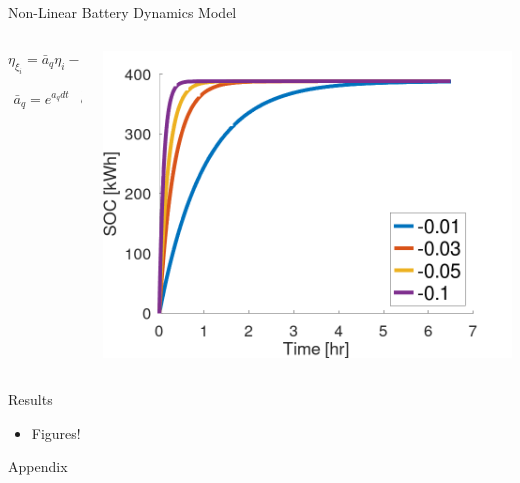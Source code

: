 \documentclass[aspectratio=169]{beamer}
\begin{document}
\begin{frame}[label={sec:org5c096d4}]{Non-Linear Battery Dynamics Model}
\begin{columns}
\begin{column}{0.3\columnwidth}
\begin{equation*}
  \eta_{\xi_i} = \bar{a}_q \eta_i - \bar{b}_q \kappa_{\Xi_i}
\end{equation*}

\begin{equation*}
\begin{array}{cc}
  \bar{a}_q = e^{a_q dt} & \bar{b}_q = e^{a_q dt} - 1
\end{array}
\end{equation*}
\end{column}

\begin{column}{0.7\columnwidth}
\begin{center}
\includegraphics[width=.9\linewidth]{./img/nonlinear-bat.png}
\end{center}
\end{column}
\end{columns}
\end{frame}

\begin{frame}[label={sec:org35fdfcc}]{Results}
\begin{itemize}
\item Figures!
\end{itemize}
\end{frame}

\appendix
\begin{frame}[label={sec:org300a292}]{Appendix}
\end{frame}
\end{document}
